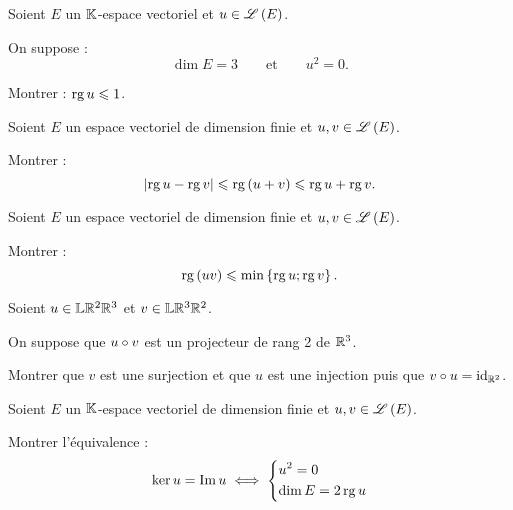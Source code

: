 \begin{corr}
\end{corr}

\begin{exo}[Exercice 7]
Soient \(E\) un \(\mathbb{K}\)-espace vectoriel et \(u\in\mathscr{L}\left(E\right)\).

On suppose : \[\dim E=3\qquad\text{et}\qquad u^2=0.\]

Montrer : \(\operatorname{rg} u\leqslant1\).
\end{exo}

\begin{corr}
\end{corr}

\begin{exo}[Exercice 8]
Soient \(E\) un espace vectoriel de dimension finie et \(u,v\in\mathscr{L}\left(E\right)\).

Montrer : \[\left\lvert\operatorname{rg} u-\operatorname{rg} v\right\rvert\leqslant\operatorname{rg}\left(u+v\right)\leqslant\operatorname{rg} u+\operatorname{rg} v.\]
\end{exo}

\begin{corr}
\end{corr}

\begin{exo}[Exercice 9]
Soient \(E\) un espace vectoriel de dimension finie et \(u,v\in\mathscr{L}\left(E\right)\).

Montrer : \[\operatorname{rg}\left(uv\right)\leqslant\min\left\lbrace\operatorname{rg} u;\operatorname{rg} v\right\rbrace.\]
\end{exo}

\begin{corr}
\end{corr}

\begin{exo}[Exercice 10]
Soient \(u\in\mathbb{L}{\mathbb{R}^2}{\mathbb{R}^3}\) et \(v\in\mathbb{L}{\mathbb{R}^3}{\mathbb{R}^2}\).

On suppose que \(u\circ v\) est un projecteur de rang 2 de \(\mathbb{R}^3\).

Montrer que \(v\) est une surjection et que \(u\) est une injection puis que \(v\circ u=\mathrm{id}_{\mathbb{R}^2}\).
\end{exo}

\begin{corr}
\end{corr}

\begin{exo}[Exercice 11]
Soient \(E\) un \(\mathbb{K}\)-espace vectoriel de dimension finie et \(u,v\in\mathscr{L}\left(E\right)\).

Montrer l'équivalence : \[\ker u=\operatorname{Im} u\iff\begin{dcases}
u^2=0 \\
\dim E=2\operatorname{rg} u
\end{dcases}\]
\end{exo}

